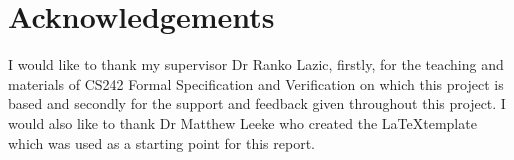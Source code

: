 
\chapter*{Acknowledgements}

I would like to thank my supervisor Dr Ranko Lazic, firstly, for the teaching and materials of CS242 Formal Specification and Verification on which this project is based and secondly for the support and feedback given throughout this project. 
I would also like to thank Dr Matthew Leeke who created the \LaTeX template which was used as a starting point for this report.

